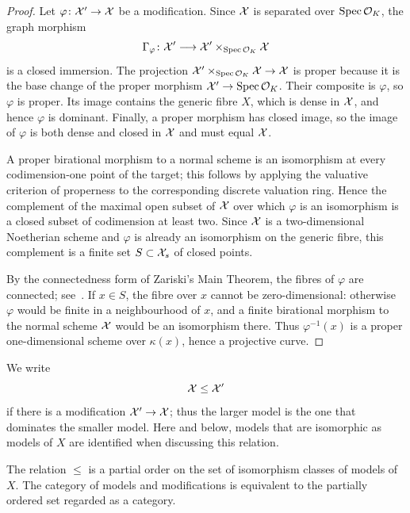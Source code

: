 \begin{proof}
    Let $\varphi\colon\mathcal X'\to\mathcal X$ be a modification.
    Since $\mathcal X$ is separated over $\operatorname{Spec}\mathcal O_K$, the graph morphism
    \[
        \Gamma_\varphi\colon\mathcal X'\longrightarrow\mathcal X'\times_{\operatorname{Spec}\mathcal O_K}\mathcal X
    \]
    is a closed immersion.
    The projection $\mathcal X'\times_{\operatorname{Spec}\mathcal O_K}\mathcal X\to\mathcal X$ is proper because it is the base change of the proper morphism $\mathcal X'\to\operatorname{Spec}\mathcal O_K$.
    Their composite is $\varphi$, so $\varphi$ is proper.
    Its image contains the generic fibre $X$, which is dense in $\mathcal X$, and hence $\varphi$ is dominant.
    Finally, a proper morphism has closed image, so the image of $\varphi$ is both dense and closed in $\mathcal X$ and must equal $\mathcal X$.

    A proper birational morphism to a normal scheme is an isomorphism at every codimension-one point of the target; this follows by applying the valuative criterion of properness to the corresponding discrete valuation ring.
    Hence the complement of the maximal open subset of $\mathcal X$ over which $\varphi$ is an isomorphism is a closed subset of codimension at least two.
    Since $\mathcal X$ is a two-dimensional Noetherian scheme and $\varphi$ is already an isomorphism on the generic fibre, this complement is a finite set $S\subset\mathcal X_s$ of closed points.

    By the connectedness form of Zariski's Main Theorem, the fibres of $\varphi$ are connected; see~\cite[\href{https://stacks.math.columbia.edu/tag/0AY8}{Lemma 0AY8}]{Stacks}.
    If $x\in S$, the fibre over $x$ cannot be zero-dimensional: otherwise $\varphi$ would be finite in a neighbourhood of $x$, and a finite birational morphism to the normal scheme $\mathcal X$ would be an isomorphism there.
    Thus $\varphi^{-1}(x)$ is a proper one-dimensional scheme over $\kappa(x)$, hence a projective curve.
\end{proof}

We write
\[
    \mathcal X\leq\mathcal X'
\]
if there is a modification $\mathcal X'\to\mathcal X$; thus the larger model is the one that dominates the smaller model.
Here and below, models that are isomorphic as models of $X$ are identified when discussing this relation.

\begin{proposition}\label{prop:partial-order-of-models}
    The relation $\leq$ is a partial order on the set of isomorphism classes of models of $X$.
    The category of models and modifications is equivalent to the partially ordered set regarded as a category.
\end{proposition}

